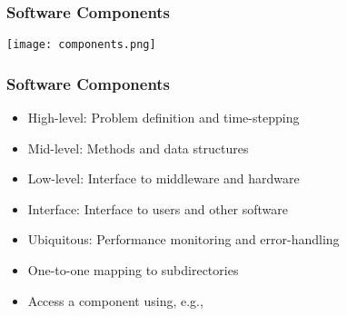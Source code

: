 \begin{frame}[fragile] \frametitle{Software Components}
\centerline{\texttt{[image: components.png]}}
\end{frame}
\begin{frame}[fragile] \frametitle{Software Components}
\begin{itemize}
\item \color{gray} High-level: Problem definition and time-stepping
\item \color{cyan} Mid-level: Methods and data structures
\item \color{magenta} Low-level: Interface to middleware and hardware
\item \color{red} Interface: Interface to users and other software
\item \color{green} Ubiquitous: Performance monitoring and error-handling
\end{itemize}
\begin{itemize}
\item One-to-one mapping to subdirectories
\item Access a component using, e.g., 
\end{itemize}
\end{frame}